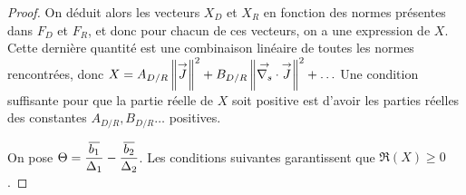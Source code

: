 \begin{proof}
    On déduit alors les vecteurs \(X_D\) et \(X_R\) en fonction des normes présentes dans \(F_D\) et \(F_R\), et donc pour chacun de ces vecteurs, on a une expression de \(X\). 
    Cette dernière quantité est une combinaison linéaire de toutes les normes rencontrées, donc \(X = A_{D/R} \left\lVert{\overset{\rightarrow}{J}}\right\rVert^2 + B_{D/R} \left\lVert{\overset{\rightarrow}{\nabla_s}} \cdot {\overset{\rightarrow}{J}}\right\rVert^2 + \ldots \)
    Une condition suffisante pour que la partie réelle de \(X\) soit positive est d'avoir les parties réelles des constantes \(A_{D/R},B_{D/R} \ldots\) positives.

    On pose \(\Theta=\dfrac{{\overline{b_1}}}{\Delta_1}-\dfrac{{\overline{b_2}}}{\Delta_2}\). Les conditions suivantes garantissent que \(\Re(X)\ge 0\).


\end{proof}
